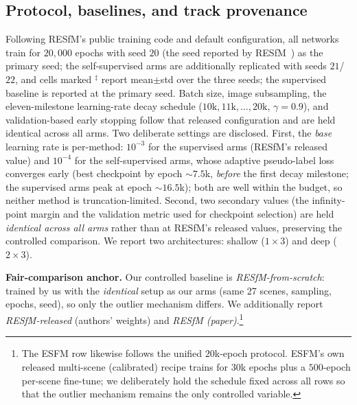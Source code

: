 \documentclass[10pt,twocolumn,letterpaper]{article}
\begin{document}
\subsection{Protocol, baselines, and track provenance}\label{sec:protocol}
Following RESfM's public training code and default configuration, all networks train for
$20{,}000$ epochs with seed $20$ (the seed reported by RESfM~\cite{resfm}) as the primary
seed; the self-supervised arms are additionally replicated with seeds $21$/$22$, and cells
marked $^{\ddagger}$ report mean$\pm$std over the three seeds; the supervised baseline
is reported at the primary seed. Batch size,
image subsampling, the eleven-milestone learning-rate decay schedule
($10\mathrm{k},11\mathrm{k},\dots,20\mathrm{k}$, $\gamma{=}0.9$), and validation-based
early stopping follow that released configuration and are held identical across all arms.
Two deliberate settings are disclosed. First, the \emph{base} learning rate is per-method:
$10^{-3}$ for the supervised arms (RESfM's released value) and $10^{-4}$ for the
self-supervised arms, whose adaptive pseudo-label loss converges early (best checkpoint by
epoch ${\sim}7.5$k, \emph{before} the first decay milestone; the supervised arms peak at
epoch ${\sim}16.5$k); both are well within the budget, so neither method is
truncation-limited. Second, two secondary values (the infinity-point margin and the
validation metric used for checkpoint selection) are held \emph{identical across all arms}
rather than at RESfM's released values, preserving the controlled comparison. We report two
architectures: shallow ($1{\times}3$) and deep ($2{\times}3$).

\noindent\textbf{Fair-comparison anchor.} Our controlled baseline is
\emph{RESfM-from-scratch}: trained by us with the \emph{identical} setup as our arms (same
27 scenes, sampling, epochs, seed), so only the outlier mechanism differs. We additionally
report \emph{RESfM-released} (authors' weights) and \emph{RESfM (paper)}.\footnote{The
ESFM row likewise follows the unified $20$k-epoch protocol. ESFM's own released
multi-scene (calibrated) recipe trains for $30$k epochs plus a $500$-epoch per-scene
fine-tune; we deliberately hold the schedule fixed across all rows so that the outlier
mechanism remains the only controlled variable.}
\end{document}
